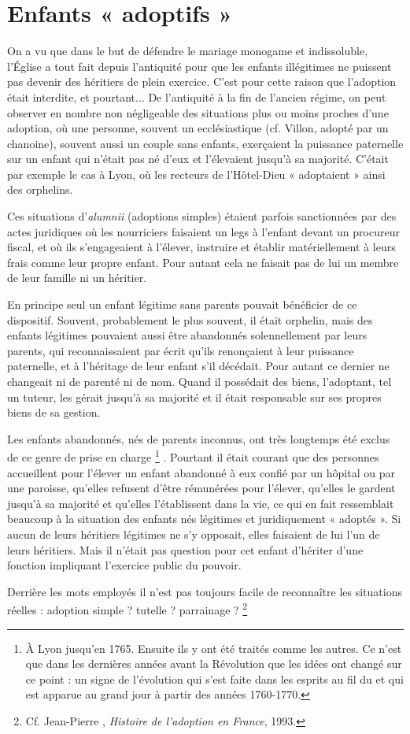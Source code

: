 \section{Enfants « adoptifs »}

 On a vu que dans le but de défendre le mariage monogame et indissoluble, l'Église a tout fait depuis l'antiquité pour que les enfants illégitimes ne puissent pas devenir des héritiers de plein exercice. C'est pour cette raison que l'adoption était interdite, et pourtant... De l'antiquité à la fin de l'ancien régime, on peut observer en nombre non négligeable des situations plus ou moins proches d'une adoption, où une personne, souvent un ecclésiastique (cf. \hbox{Villon}, adopté par un chanoine), souvent aussi un couple sans enfants, exerçaient la puissance paternelle sur un enfant qui n'était pas né d'eux et l'élevaient jusqu'à sa majorité. C'était par exemple le cas à Lyon, où les recteurs de l'Hôtel-Dieu « adoptaient » ainsi des orphelins. 

 Ces situations d'\emph{alumnii} (adoptions simples) étaient parfois sanctionnées par des actes juridiques où les nourriciers faisaient un legs à l'enfant devant un procureur fiscal, et où ils s'engageaient à l'élever, instruire et établir matériellement à leurs frais comme leur propre enfant. Pour autant cela ne faisait pas de lui un membre de leur famille ni un héritier. 

 En principe seul un enfant légitime sans parents pouvait bénéficier de ce dispositif. Souvent, probablement le plus souvent, il était orphelin, mais des enfants légitimes pouvaient aussi être abandonnés solennellement par leurs parents, qui reconnaissaient par écrit qu'ils renonçaient à leur puissance paternelle, et à l'héritage de leur enfant s'il décédait. Pour autant ce dernier ne changeait ni de parenté ni de nom. Quand il possédait des biens, l'adoptant, tel un tuteur, les gérait jusqu'à sa majorité et il était responsable sur ses propres biens de sa gestion. 

 Les enfants abandonnés, nés de parents inconnus, ont très longtemps été exclus de ce genre de prise en charge%
\footnote{À Lyon jusqu'en 1765. Ensuite ils y ont été traités comme les autres. Ce n'est que dans les dernières années avant la Révolution que les idées ont changé sur ce point : un signe de l'évolution qui s'est faite dans les esprits au fil du  et qui est apparue au grand jour à partir des années 1760-1770.}%
. Pourtant il était courant que des personnes accueillent pour l'élever un enfant abandonné à eux confié par un hôpital ou par une paroisse, qu'elles refusent d'être rémunérées pour l'élever, qu'elles le gardent jusqu'à sa majorité et qu'elles l'établissent dans la vie, ce qui en fait ressemblait beaucoup à la situation des enfants nés légitimes et juridiquement « adoptés ». Si aucun de leurs héritiers légitimes ne s'y opposait, elles faisaient de lui l'un de leurs héritiers. Mais il n'était pas question pour cet enfant d'hériter d'une fonction impliquant l'exercice public du pouvoir. 

 Derrière les mots employés il n'est pas toujours facile de reconnaître les situations réelles : adoption simple ? tutelle ? parrainage ?%
\footnote{Cf. Jean-Pierre , \emph{Histoire de l'adoption en France}, 1993.} 


